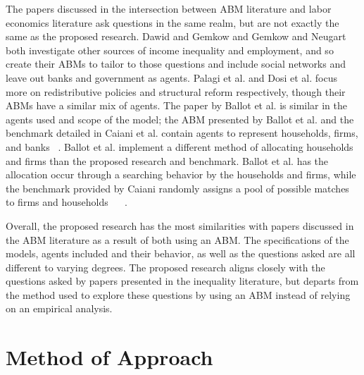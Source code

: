\documentclass[11pt]{article}
\begin{document}
The papers discussed in the intersection between ABM literature and labor economics
 literature ask questions in the same realm, but are not exactly the same as the
 proposed research. Dawid and Gemkow and Gemkow and Neugart both investigate other
  sources of income inequality and employment, and so create their ABMs to tailor
  to those questions and include social networks and leave out banks and government
   as agents.  Palagi et al. and Dosi et al. focus more on redistributive policies
    and structural reform respectively, though their ABMs have a similar mix of agents.
The paper by Ballot et al. is similar in the agents used and scope of the model;
the ABM presented by Ballot et al. and the benchmark detailed in Caiani et al.
contain agents to represent households, firms, and banks ~\cite{Caiani-benchmark-paper}.
Ballot et al. implement a different method of allocating households and firms
than the proposed research and benchmark. Ballot et al. has the allocation
occur through a searching behavior by the households and firms, while the benchmark
provided by Caiani randomly assigns a pool of possible matches to firms and
households ~\cite{Ballot-french-paper} ~\cite{Caiani-benchmark-paper}.

Overall, the proposed research has the most similarities with papers discussed
in the ABM literature as a result of both using an ABM. The specifications of
 the models, agents included and their behavior, as well as the questions asked
  are all different to varying degrees. The proposed research aligns closely
  with the questions asked by papers presented in the inequality literature,
  but departs from the method used to explore these questions by using an ABM
  instead of relying on an empirical analysis.

\section{Method of Approach}
\label{sec:method}

\end{document}
